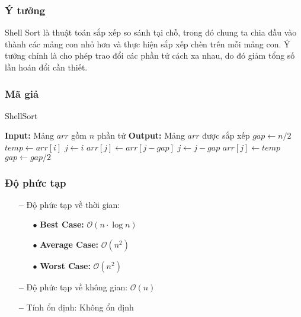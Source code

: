 \subsubsection{Ý tưởng}
Shell Sort là thuật toán sắp xếp so sánh tại chỗ, trong đó chung ta chia đầu vào thành các mảng con nhỏ hơn và thực hiện sắp xếp chèn trên mỗi mảng con. Ý tưởng chính là cho phép trao đổi các phần tử cách xa nhau, do đó giảm tổng số lần hoán đổi cần thiết.

\subsubsection{Mã giả}
\begin{algorithm}[H]
\caption{ShellSort}
\begin{algorithmic}[1]
    \State \textbf{Input:} Mảng $arr$ gồm $n$ phần tử
    \State \textbf{Output:} Mảng $arr$ được sắp xếp
    \State $gap \gets n/2$
            \State $temp \gets arr[i]$
            \State $j \gets i$
                \State $arr[j] \gets arr[j - gap]$
                \State $j \gets j - gap$
            \EndWhile
            \State $arr[j] \gets temp$
        \EndFor
        \State $gap \gets gap / 2$
    \EndWhile
\EndProcedure
\end{algorithmic}
\end{algorithm}

\subsubsection{Độ phức tạp}
\begin{itemize}
    \item[\textbf{--}]Độ phức tạp về thời gian:
        \begin{itemize}
            \item[$\bullet$] \textbf{Best Case:} $\mathcal{O}(n \cdot \log{}n)$
            \item[$\bullet$] \textbf{Average Case:}  $\mathcal{O}(n^2)$
            \item[$\bullet$] \textbf{Worst Case:}  $\mathcal{O}(n^2)$
        \end{itemize}
    \item[\textbf{--}]Độ phức tạp về không gian: $\mathcal{O}(n)$ 
    \item[\textbf{--}]Tính ổn định: Không ổn định
\end{itemize}
